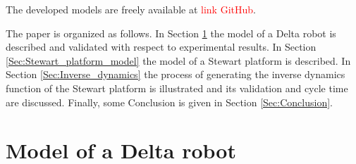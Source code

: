 \documentclass[]{interact}
\theoremstyle{plain}%
\theoremstyle{definition}
\theoremstyle{remark}
\begin{document}
The developed models are freely available at \textcolor{red}{link GitHub}.

The paper is organized as follows. In Section \ref{Sec:Delta_robot_model} the model of a Delta robot is described and validated with respect to experimental results. In Section \ref{Sec:Stewart_platform_model} the model of a Stewart platform is described. In Section \ref{Sec:Inverse_dynamics} the process of generating the inverse dynamics function of the Stewart platform is illustrated and its validation and cycle time are discussed. Finally, some Conclusion is given in Section \ref{Sec:Conclusion}.

\section{Model of a Delta robot}
\label{Sec:Delta_robot_model}
\end{document}
